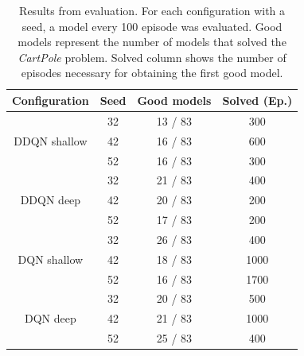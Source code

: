 \begin{table}
	\centering
	\begin{tabular}{|c|c|c|c|}
		\hline
		\textbf{Configuration} & \textbf{Seed} & \textbf{Good models} & \textbf{Solved (Ep.)} \\
		\hline
			 & 32 & 13 / 83 & 300 \\
		DDQN shallow & 42 & 16 / 83 & 600 \\
			 & 52 & 16 / 83 & 300 \\
		\hline
		 		& 32 & 21 / 83 & 400 \\
		DDQN deep  & 42 & 20 / 83 & 200 \\
				  & 52 & 17 / 83 & 200 \\
		\hline
					& 32 & 26 / 83 & 400 \\
		DQN	shallow & 42 & 18 / 83 & 1000 \\
					& 52 & 16 / 83 & 1700 \\
		\hline
				 & 32 & 20 / 83 & 500 \\
		DQN deep & 42 & 21 / 83 & 1000 \\
				 & 52 & 25 / 83 & 400 \\
		\hline
	\end{tabular}
	\caption{Results from evaluation. For each configuration with a seed, a model every 100 episode was evaluated. Good models represent the number of models that solved the \textit{CartPole} problem. Solved column shows the number of episodes necessary for obtaining the first good model.}
	\label{tab:comparison_table}
\end{table}
